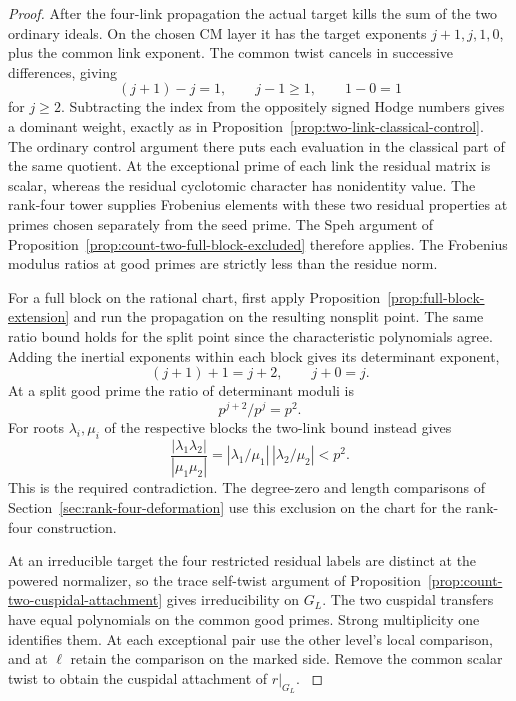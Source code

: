 \begin{proof}

After the four-link propagation the actual target kills
the sum of the two ordinary ideals. On the chosen CM
layer it has the target exponents \(j+1,j,1,0\), plus
the common link exponent. The common twist cancels in successive differences, giving
\[
 (j+1)-j=1,\qquad j-1\ge1,\qquad 1-0=1
\]
for \(j\ge2\). Subtracting the index from
the oppositely signed Hodge numbers gives a dominant
weight, exactly as in Proposition~\ref{prop:two-link-classical-control}.
The ordinary control argument there puts each evaluation
in the classical part of the same quotient. At the
exceptional prime of each link the residual matrix is
scalar, whereas the residual cyclotomic character has
nonidentity value. The rank-four tower supplies Frobenius elements with these two
residual properties at primes chosen separately from the seed prime. The Speh
argument of Proposition~\ref{prop:count-two-full-block-excluded} therefore
applies. The Frobenius modulus ratios at good primes are
strictly less than the residue norm.

For a full block on the
rational chart, first apply Proposition~\ref{prop:full-block-extension}
and run the propagation on the resulting nonsplit point.
The same ratio bound holds for the split point since the
characteristic polynomials agree. Adding the inertial exponents within each block gives its determinant exponent,
\[
 (j+1)+1=j+2,\qquad j+0=j.
\]
At a split good prime the ratio of determinant moduli is
\[
 p^{j+2}/p^j=p^2.
\]
For roots \(\lambda_i,\mu_i\) of the
respective blocks the two-link bound instead gives
\[
              \frac{|\lambda_1\lambda_2|}{|\mu_1\mu_2|}
                   =|\lambda_1/\mu_1|\,|\lambda_2/\mu_2|<p^2 .
\]
This is the required contradiction. The degree-zero and length comparisons of
Section~\ref{sec:rank-four-deformation} use this exclusion
on the chart for the rank-four construction.


At an irreducible target the four restricted residual
labels are distinct at the powered normalizer, so the
trace self-twist argument of
Proposition~\ref{prop:count-two-cuspidal-attachment} gives irreducibility
on \(G_L\). The two cuspidal transfers have equal polynomials
on the common good primes. Strong multiplicity one identifies
them. At each exceptional pair use the other level's local
comparison, and at \(\ell\) retain the comparison on the
marked side. Remove the common scalar twist to obtain the
cuspidal attachment of \(r|_{G_L}\).
\cite[Theorem 1.2 and Corollary 1.3]{newton-thorne-unitary}


\end{proof}
